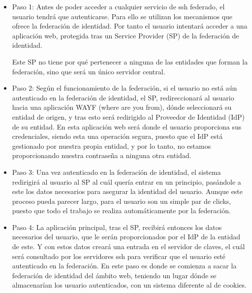     \begin{itemize}
        
        \item{Paso 1:} Antes de poder acceder a cualquier servicio de
        ssh federado, el usuario tendrá que autenticarse. Para ello se
        utilizan los mecanismos que ofrece la federación de identidad.
        Por tanto el usuario intentará acceder a una aplicación web,
        protegida tras un Service Provider (SP) de la federación de
        identidad.

        Este SP no tiene por qué pertenecer a ninguna de las entidades
        que forman la federación, sino que será un único servidor
        central.

        \item{Paso 2:} Según el funcionamiento de la federación, si el
        usuario no está aún autenticado en la federación de identidad,
        el SP, redireccionará al usuario hacia una aplicación WAYF
        (where are you from), dónde seleccionará su entidad de origen,
        y tras esto será redirigido al Proveedor de Identidad (IdP) de
        su entidad. En esta aplicación web será donde el usuario
        proporciona sus credenciales, siendo esta una operación
        segura, puesto que el IdP está gestionado por nuestra propia
        entidad, y por lo tanto, no estamos proporcionando nuestra
        contraseña a ninguna otra entidad.

        \item{Paso 3:} Una vez autenticado en la federación de
        identidad, el sistema redirigirá al usuario al SP al cuál
        quería entrar en un principio, pasándole a este los datos
        necesarios para asegurar la identidad del usuario.
        Aunque este proceso pueda parecer largo, para el usuario son
        un simple par de clicks, puesto que todo el trabajo se realiza
        automáticamente por la federación.

        \item{Paso 4:} La aplicación principal, tras el SP, recibirá
        entonces los datos necesarios del usuario, que le serán
        proporcionados por el IdP de la entidad de este. Y con estos
        datos creará una entrada en el servidor de claves, el cuál
        será consultado por los servidores ssh para verificar que el
        usuario esté autenticado en la federación.
        En este paso es donde se comienza a sacar la federación de
        identidad del ámbito web, teniendo un lugar dónde se
        almacenarían los usuario autenticados, con un sistema
        diferente al de cookies.


\end{itemize}
